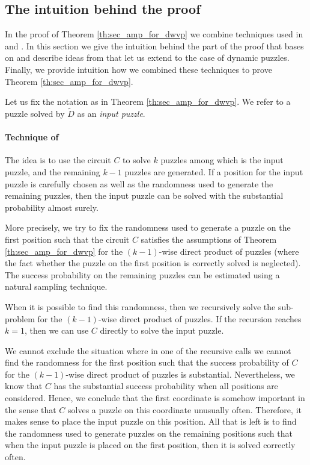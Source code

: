 %
\subsection{The intuition behind the proof}
\label{section:intuition}
In the proof of Theorem \ref{th:sec_amp_for_dwvp} we combine techniques used in \cite{dodis2009security} and \cite{holenstein2011general}.
In this section we give the intuition behind the part of the proof that bases on \cite{holenstein2011general} and
describe ideas from \cite{dodis2009security} that let us extend to the case of dynamic puzzles.
Finally, we provide intuition how we combined these techniques to prove Theorem \ref{th:sec_amp_for_dwvp}.

Let us fix the notation as in Theorem \ref{th:sec_amp_for_dwvp}.
We refer to a puzzle solved by $\widetilde{D}$ as an \textit{input puzzle}.

\paragraph{Technique of \cite{canetti2005hardness, holenstein2011general}}
The idea is to use the circuit $C$ to solve $k$ puzzles among which is the input puzzle, and
the remaining $k\!-\!1$ puzzles are generated.
If a position for the input puzzle is carefully chosen as well as the randomness used to generate the remaining puzzles,
then the input puzzle can be solved with the substantial probability almost surely.

More precisely, we try to fix the randomness used to generate a puzzle on the first position such that
the circuit $C$ satisfies the assumptions of Theorem \ref{th:sec_amp_for_dwvp}
for the $(k\!-\!1)$-wise direct product of puzzles (where the fact whether the puzzle on the first position is correctly solved is neglected).
The success probability on the remaining puzzles can be estimated using a natural sampling technique.

When it is possible to find this randomness, then we recursively solve the sub-problem for the $(k\!-\!1)$-wise direct product of puzzles.
If the recursion reaches $k=1$, then we can use $C$ directly to solve the input puzzle.

We cannot exclude the situation where in one of the recursive calls we cannot
find the randomness for the first position such that the success probability of $C$ for the $(k\!-\!1)$-wise direct product of puzzles is substantial.
Nevertheless, we know that $C$ has the substantial success probability when all positions are considered.
Hence, we conclude that the first coordinate is somehow important in the sense that $C$ solves a puzzle on this coordinate unusually often.
Therefore, it makes sense to place the input puzzle on this position.
All that is left is to find the randomness used to generate puzzles on the remaining positions
such that when the input puzzle is placed on the first position, then it is solved correctly often.


